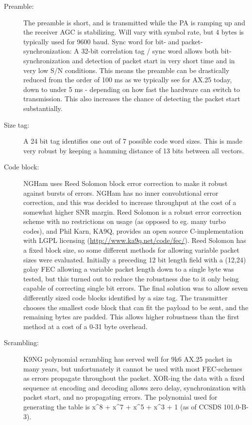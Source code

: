 \documentclass[a4paper, english, 12pt, hidelinks]{article}
\begin{document}
    \begin{description}
        \item[Preamble:] The preamble is short, and is transmitted while the PA is ramping up and the receiver AGC
        is stabilizing. Will vary with symbol rate, but 4 bytes is typically used for 9600 baud.
        Sync word for bit- and packet-synchronization: A 32-bit correlation tag / sync word allows both bit-
        synchronization and detection of packet start in very short time and in very low S/N conditions. This
        means the preamble can be drastically reduced from the order of 100 ms as we typically see for
        AX.25 today, down to under 5 ms - depending on how fast the hardware can switch to transmission.
        This also increases the chance of detecting the packet start substantially.

        \item[Size tag:] A 24 bit tag identifies one out of 7 possible code word sizes. This is made very robust by
        keeping a hamming distance of 13 bits between all vectors.

        \item[Code block:] NGHam uses Reed Solomon block error correction to make it robust against bursts of
        errors. NGHam has no inner convolutional error correction, and this was decided to increase
        throughput at the cost of a somewhat higher SNR margin. Reed Solomon is a robust error correction
        scheme with no restrictions on usage (as opposed to eg. many turbo codes), and Phil Karn, KA9Q,
        provides an open source C-implementation with LGPL licensing (\url{http://www.ka9q.net/code/fec/}).
        Reed Solomon has a fixed block size, so some different methods for allowing variable packet sizes were evaluated.
        Initially a preceding 12 bit length field with a (12,24) golay FEC allowing a variable
        packet length down to a single byte was tested, but this turned out to reduce the robustness due to
        it only being capable of correcting single bit errors. The final solution was to allow seven differently
        sized code blocks identified by a size tag. The transmitter chooses the smallest code block that can fit
        the payload to be sent, and the remaining bytes are padded. This allows higher robustness than the
        first method at a cost of a 0-31 byte overhead.

        \item[Scrambling:] K9NG polynomial scrambling has served well for 9k6 AX.25 packet in many years, but
        unfortunately it cannot be used with most FEC-schemes as errors propagate throughout the packet.
        XOR-ing the data with a fixed sequence at encoding and decoding allows zero delay, synchronization
        with packet start, and no propagating errors. The polynomial used for generating the table is x\^{}8 +
        x\^{}7 + x\^{}5 + x\^{}3 + 1 (as of CCSDS 101.0-B-3).


\end{description}
\end{document}
